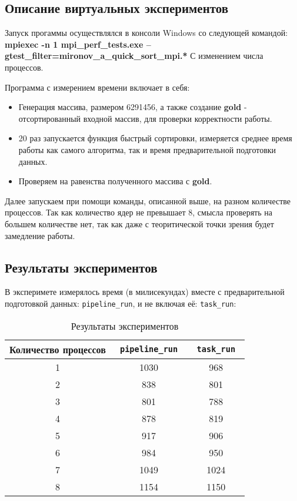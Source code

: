 \documentclass[12pt]{article}
\begin{document}
\subsection{Описание виртуальных экспериментов}
Запуск прогаммы осуществлялся в консоли Windows со следующей командой: 
\newline             
\textbf{mpiexec -n 1 mpi\_perf\_tests.exe --gtest\_filter=mironov\_a\_quick\_sort\_mpi.*}
С изменением числа процессов.

Программа с измерением времени включает в себя:
\begin{itemize}
    \item Генерация массива, размером 6291456, а также создание \textbf{gold} - отсортированный входной массив, для проверки корректности работы.
    \item 20 раз запускается функция быстрый сортировки, измеряется среднее время работы как самого алгоритма, так и время предварительной подготовки данных.
    \item Проверяем на равенства полученного массива с \textbf{gold}.
\end{itemize}

Далее запускаем при помощи команды, описанной выше, на разном количестве процессов. Так как количество ядер не превышает 8, смысла проверять на большем количестве нет, так как даже с теоритической точки зрения будет замедление работы.

\newpage
\subsection{Результаты экспериментов}
В эксперимете измерялось время (в милисекундах) вместе с предварительной подготовкой данных: \texttt{pipeline\_run}, и не включая её: \texttt{task\_run}: 

\begin{table}[H]
\centering
\caption{Результаты экспериментов}
\begin{tabular}{ccc}
\toprule
\textbf{   Количество процессов   } & \textbf{\texttt{  pipeline\_run  }} & \textbf{\texttt{ 
 task\_run  }} \\ 
\midrule
1  & 1030 & 968   \\ 
2  & 838  & 801   \\ 
3  & 801  & 788   \\ 
4  & 878  & 819   \\ 
5  & 917  & 906   \\ 
6  & 984  & 950   \\ 
7  & 1049 & 1024  \\ 
8  & 1154 & 1150  \\ 
\bottomrule
\end{tabular}
\end{table}
\end{document}
